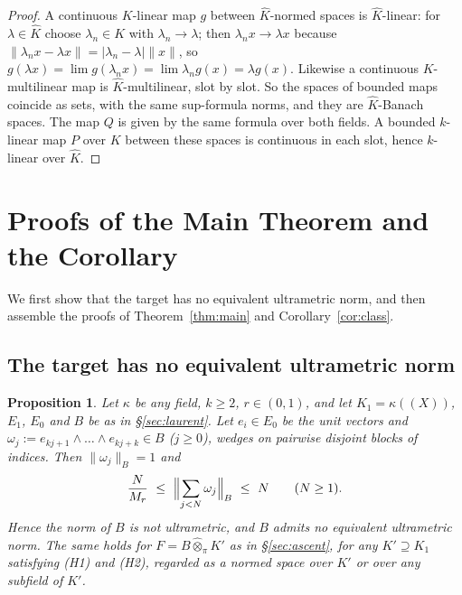 \documentclass[11pt]{amsart}
\newtheorem{proposition}[theorem]{Proposition}
\theoremstyle{definition}
\theoremstyle{remark}
\numberwithin{equation}{section}
\newcommand{\Kh}{\widehat K}
\newcommand{\abs}[1]{\lvert #1\rvert}
\newcommand{\norm}[1]{\lVert #1\rVert}
\begin{document}
\begin{proof}
A continuous $K$\nobreakdash-linear map $g$ between $\Kh$\nobreakdash-normed spaces is $\Kh$\nobreakdash-linear: for $\lambda\in\Kh$ choose $\lambda_n\in K$
with $\lambda_n\to\lambda$; then $\lambda_nx\to\lambda x$ because $\norm{\lambda_nx-\lambda x}=\abs{\lambda_n-\lambda}\norm x$,
so $g(\lambda x)=\lim g(\lambda_nx)=\lim\lambda_ng(x)=\lambda g(x)$. Likewise a continuous $K$\nobreakdash-multilinear map is
$\Kh$\nobreakdash-multilinear, slot by slot. So the spaces of bounded maps coincide as sets, with the same sup-formula norms, and
they are $\Kh$\nobreakdash-Banach spaces. The map $Q$ is given by the same formula over both fields. A bounded $k$\nobreakdash-linear map
$P$ over $K$ between these spaces is continuous in each slot, hence $k$\nobreakdash-linear over $\Kh$.
\end{proof}

\section{Proofs of the Main Theorem and the Corollary}\label{sec:proofs}
We first show that the target has no equivalent ultrametric norm, and then assemble the proofs of
Theorem~\ref{thm:main} and Corollary~\ref{cor:class}.

\subsection{The target has no equivalent ultrametric norm}

\begin{proposition}\label{prop:nonultra}
Let $\kappa$ be any field, $k\ge2$, $r\in(0,1)$, and let $K_1=\kappa((X))$, $E_1$, $E_0$ and $B$ be as in
\S\ref{sec:laurent}. Let $e_i\in E_0$ be the unit vectors and $\omega_j:=e_{kj+1}\wedge\dots\wedge e_{kj+k}\in B$
($j\ge0$), wedges on pairwise disjoint blocks of indices. Then $\norm{\omega_j}_B=1$ and
\[
\frac N{M_r}\ \le\ \Bigl\lVert\sum_{j<N}\omega_j\Bigr\rVert_B\ \le\ N\qquad(N\ge1).
\]
Hence the norm of $B$ is not ultrametric, and $B$ admits no equivalent ultrametric norm. The same holds for
$F=B\widehat\otimes_\pi K'$ as in \S\ref{sec:ascent}, for any $K'\supseteq K_1$ satisfying \textup{(H1)} and \textup{(H2)},
regarded as a normed space over $K'$ or over any subfield of $K'$.
\end{proposition}
\end{document}
